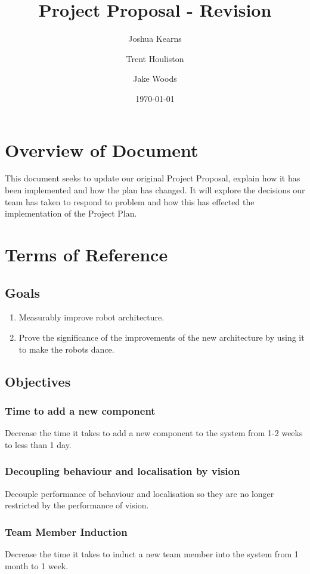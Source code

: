 \documentclass[a4paper]{article}
\title{Project Proposal - Revision}
\author{Joshua Kearns \and Trent Houliston \and Jake Woods}
\date{\today}
\begin{document}
	\maketitle
	
	\clearpage
	\tableofcontents
	\clearpage

	\section{Overview of Document}
	This document seeks to update our original Project Proposal, explain how it has been implemented and how the plan has changed. It will explore the decisions our team has taken to respond to problem and how this has effected the implementation of the Project Plan.

	\section{Terms of Reference}
		\subsection {Goals}
			\begin{enumerate}
				\item Measurably improve robot architecture.
				\item Prove the significance of the improvements of the new architecture by using it to make the robots dance.
			\end{enumerate}
		\subsection {Objectives}
			\subsubsection{Time to add a new component}
				Decrease the time it takes to add a new component to the system from 1-2 weeks to less than 1 day.
			\subsubsection{Decoupling behaviour and localisation by vision}
				Decouple performance of behaviour and localisation so they are no longer restricted by the performance of vision.
			\subsubsection{Team Member Induction}
				Decrease the time it takes to induct a new team member into the system from 1 month to 1 week.
\end{document}
